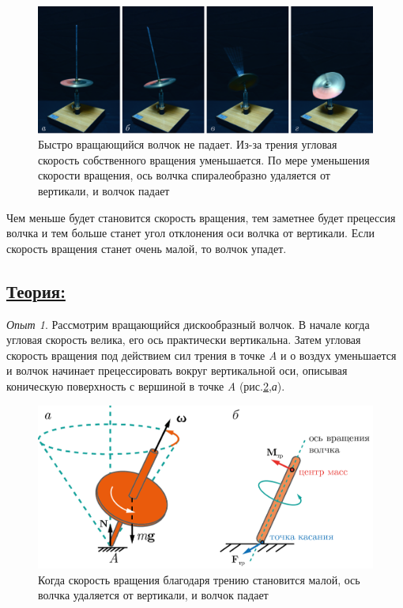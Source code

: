 \documentclass[14pt,a4paper,oneside]{extarticle}	%
\begin{document}
			\begin{figure}[H] 	
	\centering 	
	\includegraphics[width=0.9\linewidth]{gyro-5.png}
	\caption{Быстро вращающийся волчок не падает. Из-за трения угловая скорость собственного вращения уменьшается. По мере уменьшения скорости вращения, ось волчка спиралеобразно удаляется от вертикали, и волчок падает}
	\label{gyro-5}
\end{figure}

Чем меньше будет становится скорость вращения, тем заметнее будет прецессия волчка и тем больше станет угол отклонения оси волчка от вертикали.
Если скорость вращения станет очень малой, то волчок упадет.

\newpage
		\subsection*{\underline{Теория:}}
			
			\textit{Опыт 1}. Рассмотрим вращающийся дискообразный волчок.
			В начале когда угловая скорость велика, его ось практически вертикальна.
			Затем угловая скорость вращения под действием сил трения в точке  \textit{A} и о воздух уменьшается и волчок начинает прецессировать вокруг вертикальной оси, описывая коническую поверхность с вершиной в точке \textit{A} (рис.\ref{gyro-6},\textit{а}).
			
			\begin{figure}[H] 	
				\centering 	
				\includegraphics[width=0.75\linewidth]{gyro-6.png}
				\caption{Когда скорость вращения благодаря трению становится малой, ось волчка удаляется от вертикали, и волчок падает}
				\label{gyro-6}
			\end{figure}
			
\end{document}
